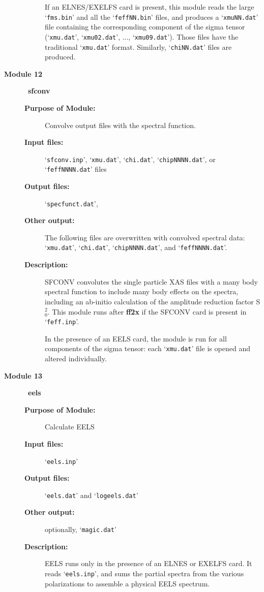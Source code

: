 \documentclass[11pt,oneside]{report} %
\newcommand{\file}[1]{`\texttt{#1}'}
\newcommand{\module}[1]{\textrm{\bf{#1}}}
\begin{document}
\begin{latexonly}
\begin{description}
\begin{description}
    If an ELNES/EXELFS card is present, this module reads the large  
    \file{fms.bin} and all the \file{feffNN.bin} files, and produces 
    a \file{xmuNN.dat} file containing the corresponding component of 
    the sigma tensor (\file{xmu.dat}, \file{xmu02.dat}, ..., \file{xmu09.dat}). 
    Those files have the traditional \file{xmu.dat} format. Similarly, 
    \file{chiNN.dat} files are produced.
  \end{description}
\item[\large\textbf{Module 12}]\dotfill\  {\large\module{sfconv}}
  \begin{description}
  \item[\textbf{Purpose of Module:}] Convolve output files with the 
    spectral function.
  \item[\textbf{Input files:}] \file{sfconv.inp}, \file{xmu.dat}, 
  \file{chi.dat}, \file{chipNNNN.dat}, or \file{feffNNNN.dat} files 
  \item[\textbf{Output files:}] \file{specfunct.dat}, 
  \item[\textbf{Other output:}] The following files are overwritten 
    with convolved spectral data: \file{xmu.dat}, \file{chi.dat}, 
    \file{chipNNNN.dat}, and \file{feffNNNN.dat}.
  \item[\textbf{Description:}] SFCONV convolutes the single particle 
    XAS files with a many body spectral function to include many body 
    effects on the spectra, including an ab-initio calculation of the 
    amplitude reduction factor S$_0^2$.  This module runs after
    \module{ff2x} if the SFCONV card is present in \file{feff.inp}.

    In the presence of an EELS card, the module is run for all 
    components of the sigma tensor: each \file{xmu.dat} file is 
    opened and altered individually.
  \end{description}
\item[\large\textbf{Module 13}]\dotfill\  {\large\module{eels}}
  \begin{description}
  \item[\textbf{Purpose of Module:}] Calculate EELS
  \item[\textbf{Input files:}] \file{eels.inp} 
  \item[\textbf{Output files:}] \file{eels.dat} and 
    \file{logeels.dat}
  \item[\textbf{Other output:}] optionally, \file{magic.dat}
  \item[\textbf{Description:}] EELS runs only in the presence of an 
    ELNES or EXELFS card. It reads \file{eels.inp}, and sums the partial spectra 
    from the various polarizations to assemble a physical EELS spectrum. 
  \end{description}


\end{description}
\end{latexonly}
\end{document}
